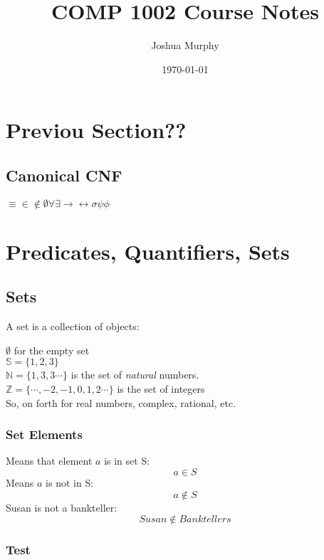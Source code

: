 \documentclass[titlepage]{article}
\title{COMP 1002 Course Notes}
\author{Joshua Murphy}
\date{\today}
\begin{document}
\maketitle
\tableofcontents{}
\pagebreak

\section{Previou Section??}
\subsection{Canonical CNF}

$\equiv \in \notin \emptyset \forall \exists \rightarrow \leftrightarrow \sigma
\psi \phi $
\section{Predicates, Quantifiers, Sets}

\subsection{Sets}

A set is a collection of objects:

$ \emptyset $ for the empty set \\
$ \mathbb{S} = \{1, 2, 3\}$ \\ 
$ \mathbb{N} = \{ 1,3,3\cdots\}$  is the set of \textit{natural} numbers. \\
$ \mathbb{Z} = \{\cdots, -2, -1, 0, 1, 2 \cdots\} $ is the set of integers \\

So, on forth  for real numbers, complex, rational, etc.

\subsubsection{Set Elements}

Means that element $a$ is in set S: 
\begin{equation}
 a \in S 
\end{equation}
Means $a$ is not in S:
\begin{equation}
 a \notin S
\end{equation}
Susan is not a bankteller: 
\begin{equation}
 Susan \notin Banktellers 
\end{equation}

\subsubsection{Test}
 
\end{document}
